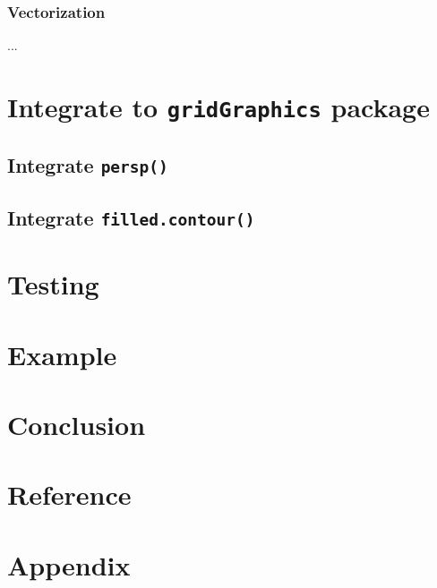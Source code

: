 \documentclass[paper=a4, fontsize=11pt]{report}
\begin{document}
\subsection{Vectorization}
...

\chapter{Integrate to \texttt{gridGraphics} package}
\section{Integrate \texttt{persp()}}
\section{Integrate \texttt{filled.contour()}}

\chapter{Testing}
\chapter{Example}
\chapter{Conclusion}
\chapter{Reference}
\chapter{Appendix}
\end{document}
